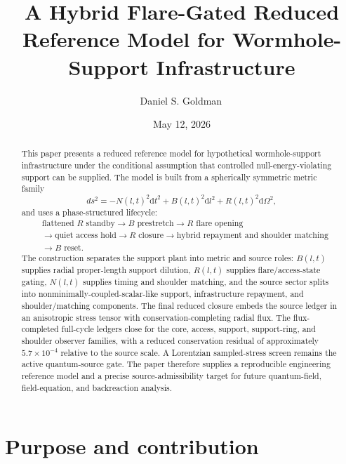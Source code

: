 \documentclass[11pt]{article}
\title{A Hybrid Flare-Gated Reduced Reference Model for Wormhole-Support Infrastructure}
\author[1]{Daniel S. Goldman\,\orcidlink{0000-0003-2835-3521}}
\affil[1]{Independent researcher; ORCID: \href{https://orcid.org/0000-0003-2835-3521}{0000-0003-2835-3521}}
\date{May 12, 2026}
\newcommand{\dd}{\mathrm{d}}
\begin{document}
\maketitle

\begin{abstract}
This paper presents a reduced reference model for hypothetical wormhole-support infrastructure under the conditional assumption that controlled null-energy-violating support can be supplied.  The model is built from a spherically symmetric metric family
\begin{equation*}
 ds^2=-N(l,t)^2\dd t^2+B(l,t)^2\dd l^2+R(l,t)^2\dd\Omega^2,
\end{equation*}
and uses a phase-structured lifecycle:
\begin{equation*}
\begin{aligned}
&\text{flattened }R\text{ standby}
\rightarrow B\text{ prestretch}
\rightarrow R\text{ flare opening}\\
&\rightarrow \text{quiet access hold}
\rightarrow R\text{ closure}
\rightarrow \text{hybrid repayment and shoulder matching}\\
&\rightarrow B\text{ reset}.
\end{aligned}
\end{equation*}
The construction separates the support plant into metric and source roles: $B(l,t)$ supplies radial proper-length support dilution, $R(l,t)$ supplies flare/access-state gating, $N(l,t)$ supplies timing and shoulder matching, and the source sector splits into nonminimally-coupled-scalar-like support, infrastructure repayment, and shoulder/matching components.  The final reduced closure embeds the source ledger in an anisotropic stress tensor with conservation-completing radial flux.  The flux-completed full-cycle ledgers close for the core, access, support, support-ring, and shoulder observer families, with a reduced conservation residual of approximately $5.7\times10^{-4}$ relative to the source scale.  A Lorentzian sampled-stress screen remains the active quantum-source gate.  The paper therefore supplies a reproducible engineering reference model and a precise source-admissibility target for future quantum-field, field-equation, and backreaction analysis.
\end{abstract}

\section{Purpose and contribution}
\end{document}
